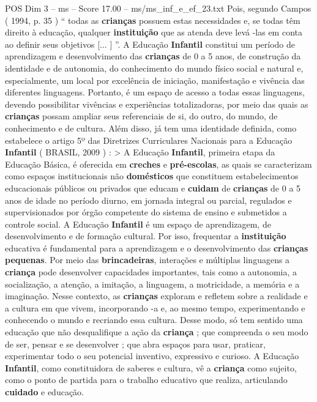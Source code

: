 \begin{textsample}{POS Dim 3 – ms – Score 17.00 – ms/ms\_inf\_e\_ef\_23.txt}
Pois, segundo Campos ( 1994, p. 35 ) “ todas as \textbf{crianças} possuem estas necessidades e, se todas têm direito à educação, qualquer \textbf{instituição} que as atenda deve levá -las em conta ao definir seus objetivos [... ] ”.
A Educação \textbf{Infantil} constitui um período de aprendizagem e desenvolvimento das \textbf{crianças} de 0 a 5 anos, de construção da identidade e de autonomia, do conhecimento do mundo físico social e natural e, especialmente, um local por excelência de iniciação, manifestação e vivência das diferentes linguagens.
Portanto, é um espaço de acesso a todas essas linguagens, devendo possibilitar vivências e experiências totalizadoras, por meio das quais as \textbf{crianças} possam ampliar seus referenciais de si, do outro, do mundo, de conhecimento e de cultura.
Além disso, já tem uma identidade definida, como estabelece o artigo 5º das Diretrizes Curriculares Nacionais para a Educação \textbf{Infantil} ( BRASIL, 2009 ) : > A Educação \textbf{Infantil}, primeira etapa da Educação Básica, é oferecida em \textbf{creches} e \textbf{pré-escolas}, as quais se caracterizam como espaços institucionais não \textbf{domésticos} que constituem estabelecimentos educacionais públicos ou privados que educam e \textbf{cuidam} de \textbf{crianças} de 0 a 5 anos de idade no período diurno, em jornada integral ou parcial, regulados e supervisionados por órgão competente do sistema de ensino e submetidos a controle social.
A Educação \textbf{Infantil} é um espaço de aprendizagem, de desenvolvimento e de formação cultural.
Por isso, frequentar a \textbf{instituição} educativa é fundamental para a aprendizagem e o desenvolvimento das \textbf{crianças} \textbf{pequenas}.
Por meio das \textbf{brincadeiras}, interações e múltiplas linguagens a \textbf{criança} pode desenvolver capacidades importantes, tais como a autonomia, a socialização, a atenção, a imitação, a linguagem, a motricidade, a memória e a imaginação.
Nesse contexto, as \textbf{crianças} exploram e refletem sobre a realidade e a cultura em que vivem, incorporando -a e, ao mesmo tempo, experimentando e conhecendo o mundo e recriando essa cultura.
Desse modo, só tem sentido uma educação que não desqualifique a ação da \textbf{criança} ; que compreenda o seu modo de ser, pensar e se desenvolver ; que abra espaços para usar, praticar, experimentar todo o seu potencial inventivo, expressivo e curioso.
A Educação \textbf{Infantil}, como constituidora de saberes e cultura, vê a \textbf{criança} como sujeito, como o ponto de partida para o trabalho educativo que realiza, articulando \textbf{cuidado} e educação.

\end{textsample}

